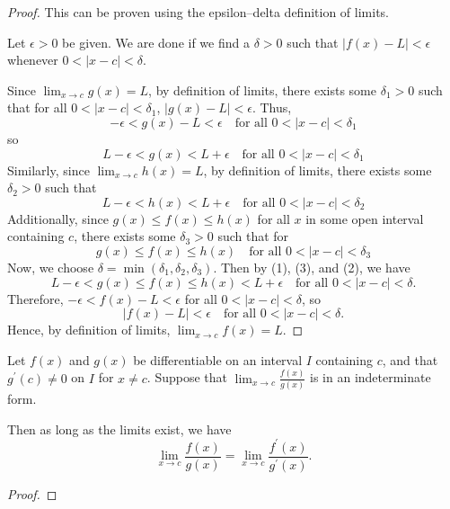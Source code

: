 \begin{proof}
This can be proven using the epsilon--delta definition of limits.

Let $\epsilon > 0$ be given. We are done if we find a $\delta > 0$ such that $|f(x)-L| < \epsilon$ whenever $0 < |x-c| < \delta$.

Since $\lim_{x\to c} g(x) = L$, by definition of limits, there exists some $\delta_1 > 0$ such that for all $0 < |x-c| < \delta_1$, $|g(x)-L| < \epsilon$.
Thus, 
\[ -\epsilon < g(x)-L < \epsilon \quad \text{for all } 0 < |x-c| < \delta_1 \]
so
\begin{equation*}\tag{1}
L-\epsilon < g(x) < L + \epsilon \quad \text{for all } 0 < |x-c| < \delta_1
\end{equation*}
Similarly, since $\lim_{x\to c} h(x) = L$, by definition of limits, there exists some $\delta_2 > 0$ such that
\begin{equation*}\tag{2}
L-\epsilon < h(x) < L + \epsilon \quad \text{for all } 0 < |x-c| < \delta_2
\end{equation*}
Additionally, since $g(x) \le f(x) \le h(x)$ for all $x$ in some open interval containing $c$, there exists some $\delta_3 > 0$ such that for 
\begin{equation*}\tag{3}
g(x) \le f(x) \le h(x) \quad \text{for all } 0 < |x-c| < \delta_3
\end{equation*}
Now, we choose $\delta = \min(\delta_1, \delta_2, \delta_3)$. Then by (1), (3), and (2), we have 
\[ L-\epsilon < g(x) \le f(x) \le h(x) < L + \epsilon \quad \text{for all } 0 < |x-c| < \delta. \]
Therefore, $-\epsilon < f(x)-L < \epsilon$ for all $0 < |x-c| < \delta$, so
\[ |f(x)-L| < \epsilon \quad \text{for all } 0 < |x-c| < \delta. \]
Hence, by definition of limits, $\lim_{x\to c} f(x) = L$.
\end{proof}

\begin{theorem}
Let $f(x)$ and $g(x)$ be differentiable on an interval $I$ containing $c$, and that $g^\prime(c)\neq0$ on $I$ for $x \neq c$. Suppose that $\lim_{x\to c}\frac{f(x)}{g(x)}$ is in an indeterminate form. 

Then as long as the limits exist, we have 
\[ \lim_{x\to c}\frac{f(x)}{g(x)} = \lim_{x\to c}\frac{f^\prime(x)}{g^\prime(x)}. \]
\end{theorem}

\begin{proof}

\end{proof}

